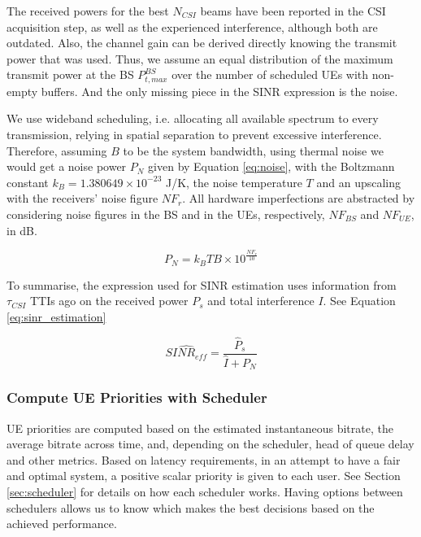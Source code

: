 The received powers for the best $N_{CSI}$ beams have been reported in the CSI acquisition step, as well as the experienced interference, although both are outdated. Also, the channel gain can be derived directly knowing the transmit power that was used. Thus, we assume an equal distribution of the maximum transmit power at the BS $P_{t, max} ^ {BS}$ over the number of scheduled UEs with non-empty buffers. And the only missing piece in the SINR expression is the noise. 

We use wideband scheduling, i.e. allocating all available spectrum to every transmission, relying in spatial separation to prevent excessive interference. Therefore, assuming $B$ to be the system bandwidth, using thermal noise we would get a noise power $P_N$ given by Equation \eqref{eq:noise}, with the Boltzmann constant $k_B = 1.380649 \times 10^{-23}$ J/K, the noise temperature $T$ and an upscaling with the receivers' noise figure $NF_r$. All hardware imperfections are abstracted by considering noise figures in the \acs{BS} and in the \acsp{UE}, respectively, $NF_{BS}$ and $NF_{UE}$, in dB.


\begin{equation} \label{eq:noise}
    P_N = k_B T B \times 10^{\frac{NF_r}{10}}
\end{equation}

To summarise, the expression used for SINR estimation uses information from $\tau_{CSI}$ TTIs ago on the received power $P_s$ and total interference $I$. See Equation \ref{eq:sinr_estimation}

\begin{equation} \label{eq:sinr_estimation}
    \hat{SINR_{eff}} = \frac{\hat{P}_s}{\hat{I} + P_N} 
\end{equation}


\subsubsection*{Compute UE Priorities with Scheduler}
UE priorities are computed based on the estimated instantaneous bitrate, the average bitrate across time, and, depending on the scheduler, head of queue delay and other metrics. Based on latency requirements, in an attempt to have a fair and optimal system, a positive scalar priority is given to each user. See Section \ref{sec:scheduler} for details on how each scheduler works. Having options between schedulers allows us to know which makes the best decisions based on the achieved performance.


